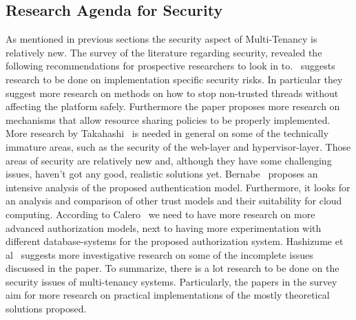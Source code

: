 \subsection{Research Agenda for Security}
As mentioned in previous sections the security aspect of Multi-Tenancy is relatively new.
The survey of the literature regarding security, revealed the following recommendations for prospective researchers to look in to.~\cite{Merino2011Security} suggests research to be done on implementation specific security risks.
In particular they suggest more research on methods on how to stop non-trusted threads without affecting the platform safely.
Furthermore the paper proposes more research on mechanisms that allow resource sharing policies to be properly implemented.
More research by Takahashi~\cite{Takahashi2012Security} is needed in general on some of the technically immature areas, such as the security of the web-layer and hypervisor-layer.
Those areas of security are relatively new and, although they have some challenging issues, haven't got any good, realistic solutions yet.
Bernabe~\cite{Bernabe2012Auth} proposes an intensive analysis of the proposed authentication model.
Furthermore, it looks for an analysis and comparison of other trust models and their suitability for cloud computing.
According to Calero~\cite{Calero2010Auth} we need to have more research on more advanced authorization models, next to having more experimentation with different database-systems for the proposed authorization system.
Hashizume et al~\cite{Hashizume2013Security} suggests more investigative research on some of the incomplete issues discussed in the paper.
To summarize, there is a lot research to be done on the security issues of multi-tenancy systems.
Particularly, the papers in the survey aim for more research on practical implementations of the mostly theoretical solutions proposed.
